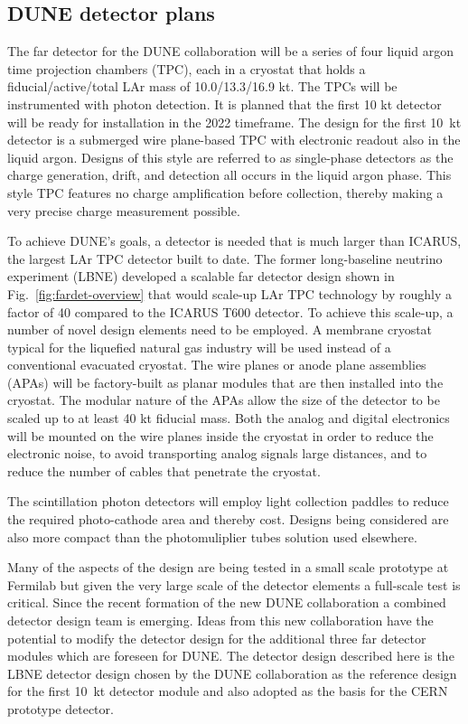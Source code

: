 \label{singlephasedet}

\subsection{DUNE detector plans}

The far detector for the DUNE collaboration will be a series of four liquid argon time projection chambers (TPC), each in a cryostat that holds a fiducial/active/total LAr mass of 10.0/13.3/16.9 kt. The TPCs will be instrumented with photon detection. It is planned that the first 10 kt detector will be ready for installation in the 2022 timeframe. 
The design for the first 10~kt detector is a submerged wire plane-based TPC with electronic readout also in the liquid argon.  Designs of this style are referred to as single-phase detectors as the charge generation, drift, and detection all occurs in the liquid argon phase.  This style TPC features no charge amplification before collection, thereby making a very precise charge measurement possible. 


To achieve DUNE's goals, a detector is needed that is much larger than ICARUS, the largest LAr TPC detector built to date. The former long-baseline neutrino experiment (LBNE) developed a scalable far detector design shown in Fig.~\ref{fig:fardet-overview} that would scale-up LAr TPC technology by roughly a factor of 40 compared to the ICARUS T600 detector. To achieve this scale-up, a number of novel design elements need to be employed. A membrane cryostat typical for the liquefied natural gas industry will be used instead of a conventional evacuated cryostat.  The wire planes or anode plane assemblies (APAs) will be factory-built as planar modules that are then installed into the cryostat. The modular nature of the APAs allow the size of the detector to be scaled up to at least 40 kt fiducial mass. Both the analog and digital electronics will be mounted on the wire planes inside the cryostat in order to reduce the electronic noise, to avoid transporting analog signals large distances, and to reduce the number of cables that penetrate the cryostat. 

The scintillation photon detectors will employ light collection paddles to reduce the required photo-cathode area and thereby cost.  Designs being considered are also more compact than the photomuliplier tubes solution used elsewhere.

Many of the aspects of the design are being tested in a small scale prototype at Fermilab but given the very large scale of the detector elements a full-scale test is critical. 
Since the recent formation of the new DUNE collaboration a combined detector design team is emerging. 
Ideas from this new collaboration have the potential to modify the detector design for the additional three far detector modules
which are foreseen for DUNE.
The detector design described here is the LBNE detector design chosen by the DUNE collaboration as the reference design for the first 10~kt 
detector module and also adopted as the basis for the CERN prototype detector.

